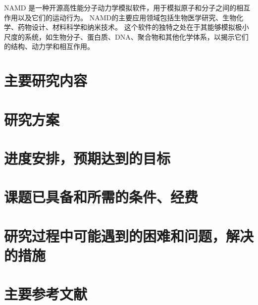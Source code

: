 NAMD 是一种开源高性能分子动力学模拟软件，用于模拟原子和分子之间的相互作用以及它们的运动行为。
NAMD的主要应用领域包括生物医学研究\cite{yao2020molecular}、生物化学\cite{knott2020characterization}、药物设计\cite{han2020computational}、材料科学和纳米技术。
这个软件的独特之处在于其能够模拟极小尺度的系统，如生物分子、蛋白质、DNA、聚合物和其他化学体系，以揭示它们的结构、动力学和相互作用。


\section{主要研究内容}
\section{研究方案}
\section{进度安排，预期达到的目标}
\section{课题已具备和所需的条件、经费}
\section{研究过程中可能遇到的困难和问题，解决的措施}
\section{主要参考文献}



